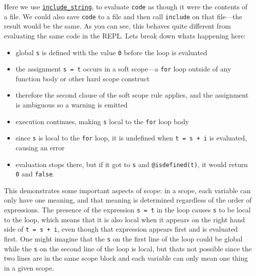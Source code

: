 Here we use \hyperlink{2796348696499086186}{\texttt{include\_string}}, to evaluate \texttt{code} as though it were the contents of a file. We could also save \texttt{code} to a file and then call \texttt{include} on that file—the result would be the same. As you can see, this behaves quite different from evaluating the same code in the REPL. Let{\textquotesingle}s break down what{\textquotesingle}s happening here:



\begin{itemize}
\item global \texttt{s} is defined with the value \texttt{0} before the loop is evaluated


\item the assignment \texttt{s = t} occurs in a soft scope—a \texttt{for} loop outside of any function body or other hard scope construct


\item therefore the second clause of the soft scope rule applies, and the assignment is ambiguous so a warning is emitted


\item execution continues, making \texttt{s} local to the \texttt{for} loop body


\item since \texttt{s} is local to the \texttt{for} loop, it is undefined when \texttt{t = s + i} is evaluated, causing an error


\item evaluation stops there, but if it got to \texttt{s} and \texttt{@isdefined(t)}, it would return \texttt{0} and \texttt{false}.

\end{itemize}


This demonstrates some important aspects of scope: in a scope, each variable can only have one meaning, and that meaning is determined regardless of the order of expressions. The presence of the expression \texttt{s = t} in the loop causes \texttt{s} to be local to the loop, which means that it is also local when it appears on the right hand side of \texttt{t = s + i}, even though that expression appears first and is evaluated first. One might imagine that the \texttt{s} on the first line of the loop could be global while the \texttt{s} on the second line of the loop is local, but that{\textquotesingle}s not possible since the two lines are in the same scope block and each variable can only mean one thing in a given scope.



